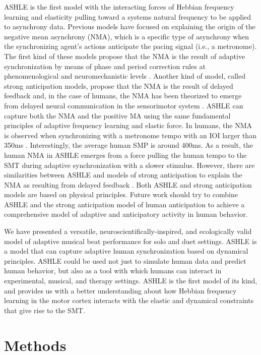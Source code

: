 \documentclass[10pt,letterpaper]{article}
\begin{document}
ASHLE is the first model with the interacting forces of Hebbian frequency learning and elasticity pulling toward a systems natural frequency to be applied to asynchrony data. Previous models have focused on explaining the origin of the negative mean asynchrony (NMA), which is a specific type of asynchrony when the synchronizing agent's actions anticipate the pacing signal (i.e., a metronome). The first kind of these models propose that the NMA is the result of adaptive synchronization by means of phase and period correction rules at phenomenological \cite{van2013adaptation} and neuromechanistic levels \cite{bose2019neuromechanistic}. Another kind of model, called strong anticipation models, propose that the NMA is the result of delayed feedback \cite{stepp2010strong} and, in the case of humans, the NMA has been theorized to emerge from delayed neural communication in the sensorimotor system \cite{roman2019delayed}. ASHLE can capture both the NMA and the positive MA using the same fundamental principles of adaptive frequency learning and elastic force. In humans, the NMA is observed when synchronizing with a metronome tempo with an IOI larger than 350ms \cite{mates1994temporal}. Interestingly, the average human SMP is around 400ms. As a result, the human NMA in ASHLE emerges from a force pulling the human tempo to the SMT during adaptive synchronization with a slower stimulus. However, there are similarities between ASHLE and models of strong anticipation to explain the NMA as resulting from delayed feedback \cite{stepp2010strong, roman2019delayed}. Both ASHLE and strong anticipation models are based on physical principles. Future work should try to combine ASHLE and the strong anticipation model of human anticipation to achieve a comprehensive model of adaptive and anticipatory activity in human behavior.

We have presented a versatile, neuroscientifically-inspired, and ecologically valid model of adaptive musical beat performance for solo and duet settings. ASHLE is a model that can capture adaptive human synchronization based on dynamical principles. ASHLE could be used not just to simulate human data and predict human behavior, but also as a tool with which humans can interact in experimental, musical, and therapy settings. ASHLE is the first model of its kind, and provides us with a better understanding about how Hebbian frequency learning in the motor cortex interacts with the elastic and dynamical constraints that give rise to the SMT.

\section*{Methods}
\end{document}
